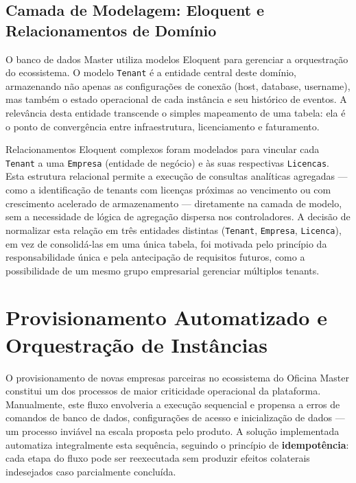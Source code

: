 \subsection{Camada de Modelagem: Eloquent e Relacionamentos de Domínio}

O banco de dados Master utiliza modelos Eloquent para gerenciar a orquestração
do ecossistema. O modelo \texttt{Tenant} é a entidade central deste domínio,
armazenando não apenas as configurações de conexão (host, database, username),
mas também o estado operacional de cada instância e seu histórico de eventos.
A relevância desta entidade transcende o simples mapeamento de uma tabela: ela
é o ponto de convergência entre infraestrutura, licenciamento e faturamento.

Relacionamentos Eloquent complexos foram modelados para vincular cada
\texttt{Tenant} a uma \texttt{Empresa} (entidade de negócio) e às suas
respectivas \texttt{Licencas}. Esta estrutura relacional permite a execução de
consultas analíticas agregadas --- como a identificação de tenants com licenças
próximas ao vencimento ou com crescimento acelerado de armazenamento ---
diretamente na camada de modelo, sem a necessidade de lógica de agregação
dispersa nos controladores. A decisão de normalizar esta relação em três
entidades distintas (\texttt{Tenant}, \texttt{Empresa}, \texttt{Licenca}),
em vez de consolidá-las em uma única tabela, foi motivada pelo princípio da
responsabilidade única e pela antecipação de requisitos futuros, como a
possibilidade de um mesmo grupo empresarial gerenciar múltiplos tenants.


\section{Provisionamento Automatizado e Orquestração de Instâncias}

O provisionamento de novas empresas parceiras no ecossistema do Oficina Master
constitui um dos processos de maior criticidade operacional da plataforma.
Manualmente, este fluxo envolveria a execução sequencial e propensa a erros de
comandos de banco de dados, configurações de acesso e inicialização de dados
--- um processo inviável na escala proposta pelo produto. A solução implementada
automatiza integralmente esta sequência, seguindo o princípio de
\textbf{idempotência}: cada etapa do fluxo pode ser reexecutada sem produzir
efeitos colaterais indesejados caso parcialmente concluída.

